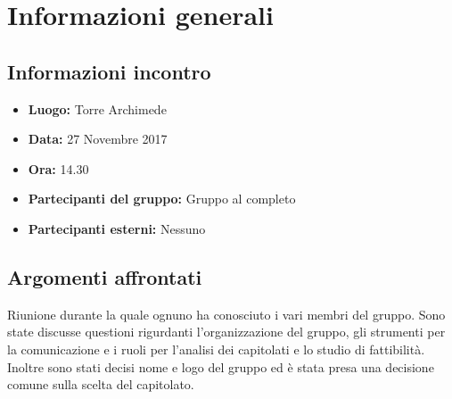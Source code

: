\section{Informazioni generali}
\subsection{Informazioni incontro}
\begin{itemize}
	\item { \textbf{Luogo:} Torre Archimede  }
	\item { \textbf{Data:} 27 Novembre 2017 }
	\item { \textbf{Ora:} 14.30 }
	\item { \textbf{Partecipanti del gruppo:} Gruppo al completo }
	\item { \textbf{Partecipanti esterni:} Nessuno }
\end{itemize}


\subsection{Argomenti affrontati}
Riunione durante la quale ognuno ha conosciuto i vari membri del gruppo. Sono state discusse questioni rigurdanti l'organizzazione del gruppo, gli strumenti per la comunicazione e i ruoli per l'analisi dei capitolati e lo studio di fattibilità. Inoltre sono stati decisi nome e logo del gruppo ed è stata presa una decisione comune sulla scelta del capitolato.


